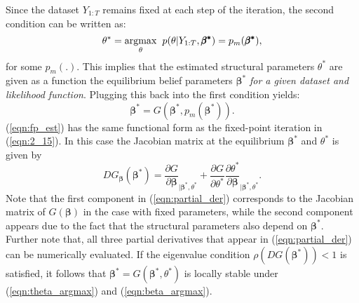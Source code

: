 \begin{appendix}
\noindent
Since the dataset $Y_{1:T}$ remains fixed at each step of the iteration, the second condition can be written as:
\begin{equation}
\theta^{*}=\underset{\theta}{\operatorname{argmax}} \hspace{2 mm} p(\theta | Y_{1:T},\pmb{\beta^{*}})= p_m(\pmb{\beta^{*}}),
\end{equation}
\noindent
for some $p_m(.)$. This implies that the estimated structural parameters $\theta^{*}$ are given as a function the equilibrium belief parameters $\pmb{\beta^{*}}$ \textit{for a given dataset and likelihood function}. Plugging this back into the first condition yields:
\begin{equation}
\pmb{\beta^{*}}=G(\pmb{\beta^{*}},p_m(\pmb{\beta^{*}}) ).
\label{eqn:fp_est}
\end{equation}
\noindent
(\ref{eqn:fp_est}) has the same functional form as the fixed-point iteration in (\ref{eqn:2_15}). In this case the Jacobian matrix at the equilibrium $\pmb{\beta^{*}}$ and $\theta^{*}$ is given by
\begin{equation}
{DG}_{\pmb{\beta}}{(\pmb{\beta^{*}})}= \frac{\partial G}{\partial \pmb{\beta}}_{|{\pmb{\beta^{*}}, \theta^{*}} }+ \frac{\partial G}{\partial \theta^{*}} \frac{\partial \theta^{*}}{\partial \pmb{\beta}}_{| \pmb{\beta^{*}},\theta^{*}}.
\label{eqn:partial_der}
\end{equation}
\noindent
Note that the first component in (\ref{eqn:partial_der}) corresponds to the Jacobian matrix of $G(\pmb{\beta})$ in the case with fixed parameters, while the second component appears due to the fact that the structural parameters also depend on $\pmb{\beta^{*}}$. Further note that, all three partial derivatives that appear in (\ref{eqn:partial_der}) can be numerically evaluated. If the eigenvalue condition $\rho(D{G}(\pmb{\beta^{*}}))<1$ is satisfied, it follows that   $\pmb{\beta^{*}}=G(\pmb{\beta^{*}},\theta^{*})$ is locally stable under (\ref{eqn:theta_argmax}) and (\ref{eqn:beta_argmax}). 




\end{appendix}
